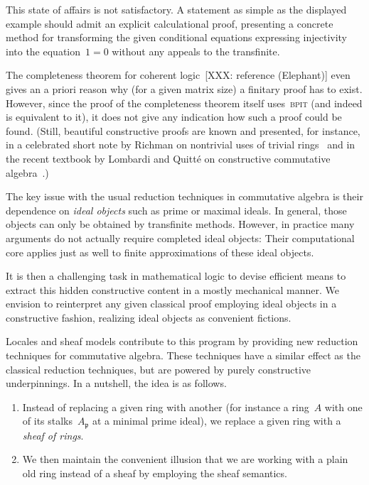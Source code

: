 \documentclass{ws-rv9x6}
\newcommand{\ppp}{\mathfrak{p}}
\renewcommand{\_}{\mathpunct{.}}
\newcommand{\?}{\,{:}\,}
\newcommand{\BPIT}{\textsc{bpit}\xspace}
\begin{document}
This state of affairs is not satisfactory. A statement as simple as the
displayed example should admit an explicit calculational proof, presenting a
concrete method for transforming the given conditional equations expressing
injectivity into the equation~$1 = 0$ without any appeals to the transfinite.

The completeness theorem for coherent logic~[XXX: reference (Elephant)] even
gives an a priori reason why (for a given matrix size) a finitary proof has to
exist. However, since the proof of the completeness theorem itself uses~\BPIT
(and indeed is equivalent to it), it does not give any indication how such a
proof could be found. (Still, beautiful constructive proofs are known and
presented, for instance, in a celebrated short note by Richman on nontrivial
uses of trivial rings~\cite{richman:trivial-rings} and in the recent textbook by
Lombardi and Quitté on constructive commutative
algebra~\cite{lombardi-quitte:constructive-commutative-algebra}.)

The key issue with the usual reduction techniques in commutative algebra is
their dependence on \emph{ideal objects} such as prime or maximal ideals. In
general, those objects can only be obtained by transfinite methods. However, in
practice many arguments do not actually require completed ideal objects:
Their computational core applies just as well to finite approximations of
these ideal objects.

It is then a challenging task in mathematical logic to devise efficient means to
extract this hidden constructive content in a mostly mechanical manner. We
envision to reinterpret any given classical proof employing ideal objects in a
constructive fashion, realizing ideal objects as convenient fictions.

Locales and sheaf models contribute to this program by providing new reduction
techniques for commutative algebra. These techniques have a similar effect as the
classical reduction techniques, but are powered by purely constructive
underpinnings. In a nutshell, the idea is as follows.

\begin{enumerate}
\item Instead of replacing a given ring with another (for instance a ring~$A$ with
one of its stalks~$A_\ppp$ at a minimal prime ideal), we replace a given ring
with a \emph{sheaf of rings}.
\item We then maintain the convenient illusion that we are working with a plain old ring
instead of a sheaf by employing the sheaf semantics.
\end{enumerate}
\end{document}
